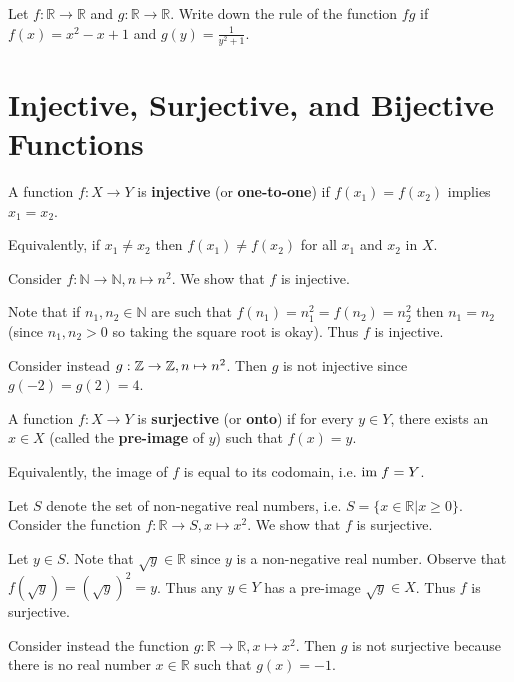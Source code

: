 \begin{exercise}
    Let $f: \mathbb{R} \to \mathbb{R}$ and $g: \mathbb{R} \to \mathbb{R}$. Write down the rule of the function $fg$ if $f(x) = x^2 - x + 1$ and $g(y) = \frac1{y^2+1}$.
\end{exercise}

\section{Injective, Surjective, and Bijective Functions}
\begin{definition}
    A function $f: X \to Y$ is \textbf{injective} (or \textbf{one-to-one}) if $f(x_1) = f(x_2)$ implies $x_1 = x_2$.
\end{definition}
\begin{remark}
    Equivalently, if $x_1 \neq x_2$ then $f(x_1) \neq f(x_2)$ for all $x_1$ and $x_2$ in $X$.
\end{remark}
\begin{example}
    Consider $f: \mathbb{N} \to \mathbb{N}, n \mapsto n^2$. We show that $f$ is injective.

    Note that if $n_1, n_2 \in \mathbb{N}$ are such that $f(n_1) = n_1^2 = f(n_2) = n_2^2$ then $n_1 = n_2$ (since $n_1, n_2 > 0$ so taking the square root is okay). Thus $f$ is injective.
\end{example}
\begin{example}
    Consider instead $g: \mathbb{Z} \to \mathbb{Z}, n \mapsto n^2$. Then $g$ is not injective since $g(-2) = g(2) = 4$.
\end{example}

\begin{definition}
    A function $f: X \to Y$ is \textbf{surjective} (or \textbf{onto}) if for every $y \in Y$, there exists an $x \in X$ (called the \textbf{pre-image} of $y$) such that $f(x) = y$.
\end{definition}
\begin{remark}
    Equivalently, the image of $f$ is equal to its codomain, i.e. $\mathrm{im}\; f = Y$.
\end{remark}
\begin{example}
    Let $S$ denote the set of non-negative real numbers, i.e. $S = \{x\in\mathbb{R} | x \geq 0\}$. Consider the function $f: \mathbb{R} \to S, x \mapsto x^2$. We show that $f$ is surjective.

    Let $y \in S$. Note that $\sqrt{y} \in \mathbb{R}$ since $y$ is a non-negative real number. Observe that $f(\sqrt{y}) = (\sqrt y)^2 = y$. Thus any $y \in Y$ has a pre-image $\sqrt y \in X$. Thus $f$ is surjective.
\end{example}
\begin{example}
    Consider instead the function $g: \mathbb{R} \to \mathbb{R}, x \mapsto x^2$. Then $g$ is not surjective because there is no real number $x \in \mathbb{R}$ such that $g(x) = -1$.
\end{example}

